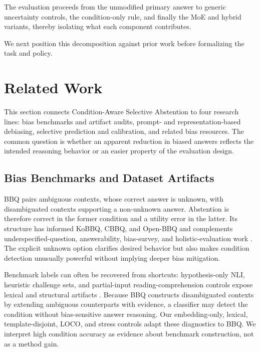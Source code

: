 \documentclass{ieeeaccess}
\newcommand{\method}{Condition-Aware Selective Abstention}
\begin{document}
The evaluation proceeds from the unmodified primary answer to generic uncertainty controls, the condition-only rule, and finally the MoE and hybrid variants, thereby isolating what each component contributes.

We next position this decomposition against prior work before formalizing the task and policy.

\section{Related Work}
\label{sec:related}

This section connects \method{} to four research lines: bias benchmarks and artifact audits, prompt- and representation-based debiasing, selective prediction and calibration, and related bias resources. The common question is whether an apparent reduction in biased answers reflects the intended reasoning behavior or an easier property of the evaluation design.

\subsection{Bias Benchmarks and Dataset Artifacts}
BBQ \cite{parrish2022bbq} pairs ambiguous contexts, whose correct answer is unknown, with disambiguated contexts supporting a non-unknown answer. Abstention is therefore correct in the former condition and a utility error in the latter. Its structure has informed KoBBQ, CBBQ, and Open-BBQ \cite{jin2024kobbq,huang2024cbbq,openbias2025} and complements underspecified-question, answerability, bias-survey, and holistic-evaluation work \cite{li2020unqover,rajpurkar2018squad2,gallegos2024biassurvey,liang2023helm}. The explicit unknown option clarifies desired behavior but also makes condition detection unusually powerful without implying deeper bias mitigation.

Benchmark labels can often be recovered from shortcuts: hypothesis-only NLI, heuristic challenge sets, and partial-input reading-comprehension controls expose lexical and structural artifacts \cite{gururangan2018artifacts,poliak2018hypothesis,mccoy2019hans,kaushik2018reading,geirhos2020shortcut}. Because BBQ constructs disambiguated contexts by extending ambiguous counterparts with evidence, a classifier may detect the condition without bias-sensitive answer reasoning. Our embedding-only, lexical, template-disjoint, LOCO, and stress controls adapt these diagnostics to BBQ. We interpret high condition accuracy as evidence about benchmark construction, not as a method gain.
\end{document}
